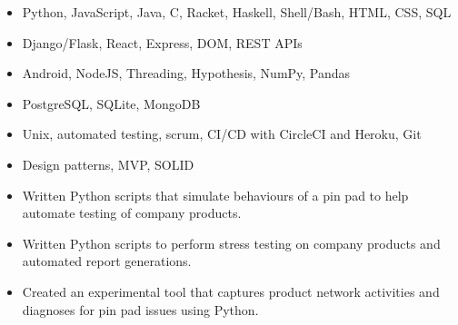 \documentclass[10pt,a4paper]{altacv}
\begin{document}

\begin{fullwidth}
\makecvheader
\end{fullwidth}


\marginpar{\vspace*{-85pt}\raggedright}




\begin{itemize}
  \item Python, JavaScript, Java, C, Racket, Haskell, Shell/Bash, HTML, CSS, SQL
\end{itemize}

\vspace{5pt}


\begin{itemize}
  \item Django/Flask, React, Express, DOM, REST APIs
  \item Android, NodeJS, Threading, Hypothesis, NumPy, Pandas
  \item PostgreSQL, SQLite, MongoDB
  \item Unix, automated testing, scrum, CI/CD with CircleCI and Heroku, Git
  \item Design patterns, MVP, SOLID
\end{itemize}



\begin{itemize}
\item Written Python scripts that simulate behaviours of a pin pad to help automate testing of company products.
\item Written Python scripts to perform stress testing on company products and automated report generations.
\item Created an experimental tool that captures product network activities and diagnoses for pin pad issues using Python.
\end{itemize}
\end{document}
